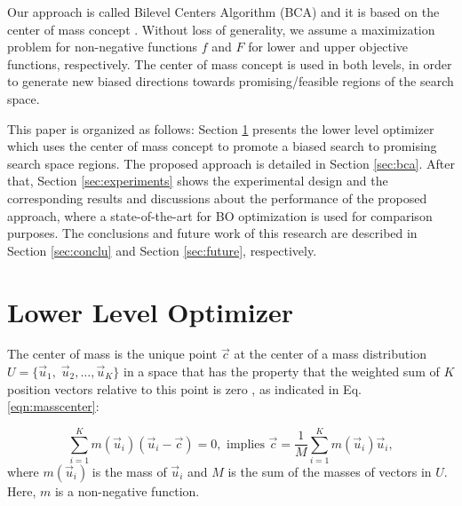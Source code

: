 \documentclass[conference]{IEEEtran}
\begin{document}
Our approach is called Bilevel Centers Algorithm (BCA) and it is based on the center
of mass concept \cite{Mejia2018}. Without loss of generality, we assume a maximization
problem for non-negative functions $f$ and $F$ for lower and upper objective
functions, respectively. The center of mass concept is used in both levels, in
order to generate new biased directions towards promising/feasible regions of
the search space.


This paper is organized as follows: Section \ref{sec:ll-optimizer} presents the
lower level optimizer which uses the center of mass concept to promote a biased
search to promising search space regions. The proposed approach is detailed in
Section \ref{sec:bca}. After that, Section \ref{sec:experiments} shows the experimental
design and the corresponding results and discussions about the performance of the
proposed approach, where a state-of-the-art for BO optimization is used for comparison
purposes. The conclusions and future work of this research are described in
Section \ref{sec:conclu} and Section \ref{sec:future}, respectively.


\section{Lower Level Optimizer} %
\label{sec:ll-optimizer}

The center of mass is the unique point $\vec{c}$ at the center of a mass distribution
$U = \{\vec{u}_1,\; \vec{u}_2 , \ldots , \vec{u}_K \}$ in a space that 
has the property that the weighted sum of $K$ position vectors relative to this
point is zero \cite{Mejia2018}, as indicated in Eq. \ref{eqn:masscenter}:

\begin{equation}
    \sum_{i = 1}^K m(\vec{u}_i) (\vec{u}_i - \vec{c}) = 0,  \text{ implies } 
    \vec{c} = \dfrac{1}{M} \sum_{i = 1}^K  m(\vec{u}_i)  \vec{u}_i,
    \label{eqn:masscenter}
\end{equation}
%
%
where $m(\vec{u}_i)$ is the mass of $\vec{u}_i$ and  $M$ is the sum of the 
masses of vectors in $U$. Here, $m$ is a non-negative function.
 
\end{document}
